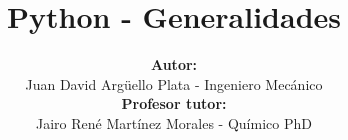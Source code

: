 \documentclass[20]{beamer}
\title[ACMA]{\textbf{Python - Generalidades}}
\author[Juan David]{
\textbf{Autor:}\\
Juan David Argüello Plata - Ingeniero Mecánico\\
\vspace{5pt}
\textbf{Profesor tutor:}\\
Jairo René Martínez Morales - Químico PhD
}
\institute[UIS]{
	CENIVAM\\
	Universidad Industrial de Santander
}
\date{}
\begin{document}
\begin{frame}
\titlepage
\end{frame}














\end{document}
